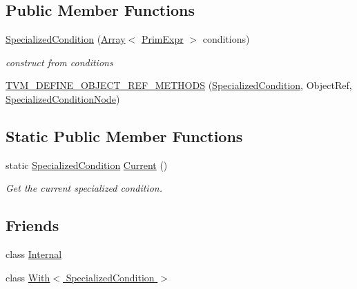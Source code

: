 \subsection*{Public Member Functions}
\begin{DoxyCompactItemize}
\item 
\hyperlink{classtvm_1_1te_1_1SpecializedCondition_a48d119ee1c6033929a5592cfc2592e60}{Specialized\+Condition} (\hyperlink{classtvm_1_1Array}{Array}$<$ \hyperlink{classtvm_1_1PrimExpr}{Prim\+Expr} $>$ conditions)
\begin{DoxyCompactList}\small\item\em construct from conditions \end{DoxyCompactList}\item 
\hyperlink{classtvm_1_1te_1_1SpecializedCondition_ae220d758fa35788a78e1c61089d746c0}{T\+V\+M\+\_\+\+D\+E\+F\+I\+N\+E\+\_\+\+O\+B\+J\+E\+C\+T\+\_\+\+R\+E\+F\+\_\+\+M\+E\+T\+H\+O\+DS} (\hyperlink{classtvm_1_1te_1_1SpecializedCondition}{Specialized\+Condition}, Object\+Ref, \hyperlink{classtvm_1_1te_1_1SpecializedConditionNode}{Specialized\+Condition\+Node})
\end{DoxyCompactItemize}
\subsection*{Static Public Member Functions}
\begin{DoxyCompactItemize}
\item 
static \hyperlink{classtvm_1_1te_1_1SpecializedCondition}{Specialized\+Condition} \hyperlink{classtvm_1_1te_1_1SpecializedCondition_a5da12dcea3337e0caf59ffda33dd824a}{Current} ()
\begin{DoxyCompactList}\small\item\em Get the current specialized condition. \end{DoxyCompactList}\end{DoxyCompactItemize}
\subsection*{Friends}
\begin{DoxyCompactItemize}
\item 
class \hyperlink{classtvm_1_1te_1_1SpecializedCondition_a8bde6eb35df6b3a9f53810e0bc79fdfd}{Internal}
\item 
class \hyperlink{classtvm_1_1te_1_1SpecializedCondition_ae2aff9f2ce7debae1cb1648450f6b3fe}{With$<$ Specialized\+Condition $>$}
\end{DoxyCompactItemize}


